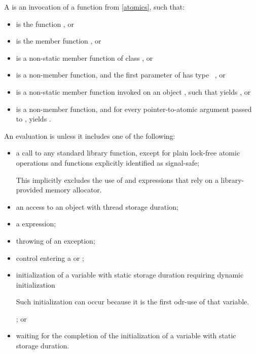 \pnum
A  is
an invocation of a function  from \ref{atomics},
such that:
\begin{itemize}
\item
{} is the function , or

\item
{} is the member function , or

\item
{} is a non-static member function of class , or

\item
{} is a non-member function, and
the first parameter of  has type \cv{}~, or

\item
{} is a non-static member function invoked on an object ,
such that  yields , or

\item
{} is a non-member function, and
for every pointer-to-atomic argument  passed to ,
 yields .
\end{itemize}

\pnum
{}%
An evaluation is  unless it includes one of the following:
\begin{itemize}
\item
a call to any standard library function,
except for plain lock-free atomic operations and
functions explicitly identified as signal-safe;
\begin{note}
This implicitly excludes the use of  and  expressions
that rely on a library-provided memory allocator.
\end{note}

\item
an access to an object with thread storage duration;

\item
a  expression;

\item
throwing of an exception;

\item
control entering a  or ;

\item
initialization of a variable with static storage duration
requiring dynamic initialization
\begin{footnote}
Such initialization can occur because it is the first odr-use of that variable.
\end{footnote}
; or

\item
waiting for the completion of the initialization of a variable with static storage duration.
\end{itemize}

